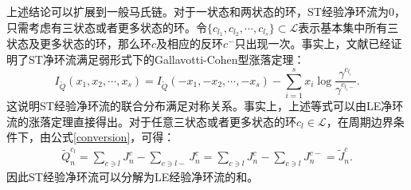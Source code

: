 上述结论可以扩展到一般马氏链。对于一状态和两状态的环，ST经验净环流为0，只需考虑有三状态或者更多状态的环。令$\{c_{l_1}, c_{l_2},\cdots, c_{l_s}\} \subset \mathcal{L}$表示基本集中所有三状态及更多状态的环，那么环$c$及相应的反环$c^-$只出现一次。事实上，文献\cite{andrieux2007fluctuation}已经证明了ST净环流满足弱形式下的Gallavotti-Cohen型涨落定理：
\begin{equation} \label{Gallavotti}
    I_{\tilde{Q}}(x_1,x_2,\cdots,x_s)
    = I_{\tilde{Q}}(-x_1,-x_2,\cdots,-x_s)
    -\sum_{i=1}^s x_i\log\frac{\gamma^{c_{l_i}}}{\gamma^{c_{l_{i}-}}}.
\end{equation}
这说明ST经验净环流的联合分布满足对称关系。事实上，上述等式可以由LE净环流的涨落定理直接得出。对于任意三状态或者更多状态的环$c_l \in \mathcal{L}$，在周期边界条件下，由公式\ref{conversion}，可得：
\begin{equation*}\label{circulation}
    \begin{split}
    \tilde{Q}^{c_l}_n =\sum_{c\ni l}J^c_n-\sum_{c\ni l-}J^c_n
    =\sum_{c\ni l}J^c_n-\sum_{c\ni l}J^{c-}_n = \tilde{J}^c_n.
    \end{split}
\end{equation*}
因此ST经验净环流可以分解为LE经验净环流的和。

